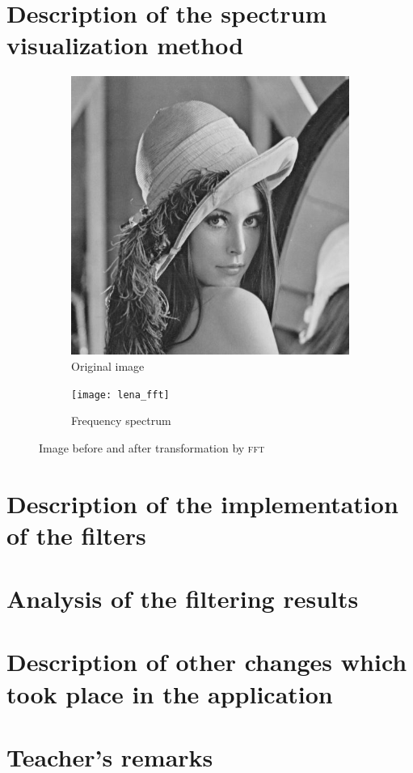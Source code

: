 \documentclass[12pt]{article}
\newcommand*{\fft}{\textsc{fft}}
\begin{document}
\section{Description of the spectrum visualization method}

\begin{figure}[H]\centering
    \begin{subfigure}[ht]{.4\textwidth}\centering
        \includegraphics[width=\textwidth]{lena}
        \caption{Original image}
    \end{subfigure}
    \hspace*{2em}
    \begin{subfigure}[ht]{.4\textwidth}\centering
        \texttt{[image: lena\_fft]}
        \caption{Frequency spectrum}
    \end{subfigure}
    \caption{Image before and after transformation by \fft}
\end{figure}

\section{Description of the implementation of the filters}

\section{Analysis of the filtering results}

\section{Description of other changes which took place in the application}

\vfill
\section*{Teacher's remarks}
\begin{tabularx}{\textwidth}{|X|}
    \hline
    \vspace{7cm}
    \phantom{.} \\
    \hline
\end{tabularx}
\end{document}

